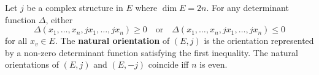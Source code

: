 Let $j$ be a complex structure in $E$ where $\dim E = 2n$. For any determinant function $\Delta$, either
$$\Delta(x_1, \ldots, x_n, jx_1, \ldots, jx_n) \geq 0 \quad \text{or} \quad \Delta(x_1, \ldots, x_n, jx_1, \ldots, jx_n) \leq 0$$
for all $x_v \in E$. The \textbf{natural orientation} of $(E,j)$ is the orientation represented by a non-zero determinant function satisfying the first inequality. The natural orientations of $(E,j)$ and $(E,-j)$ coincide iff $n$ is even.

